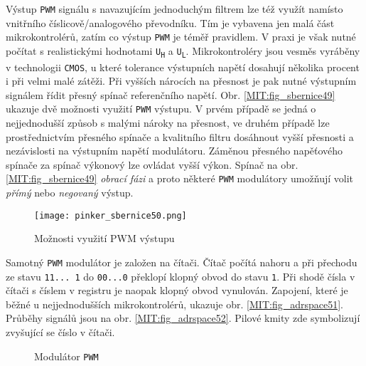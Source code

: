     Výstup \texttt{PWM} signálu s navazujícím jednoduchým filtrem lze též využít namísto vnitřního 
    číslicově/analogového převodníku. Tím je vybavena jen malá část mikrokontrolérů, zatím co 
    výstup \texttt{PWM} je téměř pravidlem. V praxi je však nutné počítat s realistickými hodnotami 
    \texttt{U\textsubscript{H}} a \texttt{U\textsubscript{L}}. Mikrokontroléry jsou vesměs vyráběny 
    v technologii \texttt{CMOS}, u které tolerance výstupních napětí dosahují několika procent i 
    při velmi malé zátěži. Při vyšších nárocích na přesnost je pak nutné výstupním signálem řídit 
    přesný spínač referenčního napětí. Obr. \ref{MIT:fig_sbernice49} ukazuje dvě možnosti využití 
    \texttt{PWM} výstupu. V prvém případě se jedná o nejjednodušší způsob s malými nároky na 
    přesnost, ve druhém případě lze prostřednictvím přesného spínače a kvalitního filtru dosáhnout 
    vyšší přesnosti a nezávislosti na výstupním napětí modulátoru. Záměnou přesného napěťového 
    spínače za spínač výkonový lze ovládat vyšší výkon. Spínač na obr. \ref{MIT:fig_sbernice49} 
    \emph{obrací fázi} a proto některé \texttt{PWM} modulátory umožňují volit \emph{přímý} nebo 
    \emph{negovaný} výstup.
    
    \begin{figure}[ht!] %
      \centering
      \texttt{[image: pinker\_sbernice50.png]}
      \caption{Možnosti využití PWM výstupu}
      \label{MIT:fig_sbernice50}
    \end{figure}
    
    Samotný \texttt{PWM} modulátor je založen na čítači. Čítač počítá nahoru a při přechodu ze 
    stavu \texttt{11... 1} do \texttt{00...0} překlopí klopný obvod do stavu \texttt{1}. Při shodě 
    čísla v čítači s číslem v registru je naopak klopný obvod vynulován. Zapojení, které je běžné u 
    nejjednodušších mikrokontrolérů, ukazuje obr. \ref{MIT:fig_adrspace51}. Průběhy signálů jsou na 
    obr. \ref{MIT:fig_adrspace52}. Pilové kmity zde symbolizují zvyšující se číslo v čítači.
    
    \begin{figure}[ht!]
      \centering  
      \caption{Modulátor \texttt{PWM}}
      \label{MIT:fig_sbernice5152}
    \end{figure}
    
